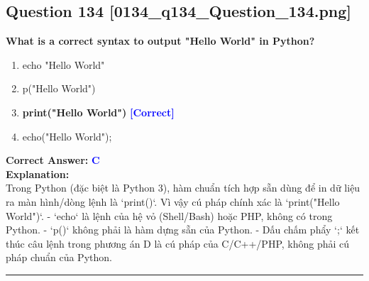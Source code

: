 \documentclass[11pt,a4paper]{article}
\begin{document}
\begin{minipage}{\textwidth}
\subsection*{Question 134 \quad \footnotesize{[0134_q134_Question_134.png]}}
\noindent \textbf{What is a correct syntax to output "Hello World" in Python?}

\begin{enumerate}[label=\Alph*.]
    \item echo "Hello World"
    \item p("Hello World")
    \item \textbf{print("Hello World")} \hfill \textcolor{blue}{\textbf{[Correct]}}
    \item echo("Hello World");
\end{enumerate}

\noindent \textbf{Correct Answer:} \textcolor{blue}{\textbf{C}} \\[4pt]
\noindent \textbf{Explanation:}\\
Trong Python (đặc biệt là Python 3), hàm chuẩn tích hợp sẵn dùng để in dữ liệu ra màn hình/dòng lệnh là `print()`. Vì vậy cú pháp chính xác là `print("Hello World")`.\newline
- `echo` là lệnh của hệ vỏ (Shell/Bash) hoặc PHP, không có trong Python.\newline
- `p()` không phải là hàm dựng sẵn của Python.\newline
- Dấu chấm phẩy `;` kết thúc câu lệnh trong phương án D là cú pháp của C/C++/PHP, không phải cú pháp chuẩn của Python.
\end{minipage}
\vspace{0.8cm}
\hrule
\vspace{0.5cm}
\end{document}
